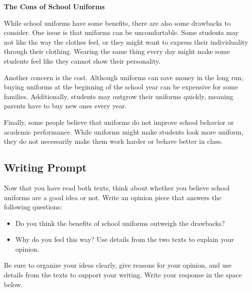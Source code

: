\documentclass[12pt]{article}
\begin{document}
\begin{tcolorbox}[colframe=black!40, colback=gray!5]

\textbf{The Cons of School Uniforms}

While school uniforms have some benefits, there are also some drawbacks to consider. One issue is that uniforms can be uncomfortable. Some students may not like the way the clothes feel, or they might want to express their individuality through their clothing. Wearing the same thing every day might make some students feel like they cannot show their personality.

Another concern is the cost. Although uniforms can save money in the long run, buying uniforms at the beginning of the school year can be expensive for some families. Additionally, students may outgrow their uniforms quickly, meaning parents have to buy new ones every year.

Finally, some people believe that uniforms do not improve school behavior or academic performance. While uniforms might make students look more uniform, they do not necessarily make them work harder or behave better in class.

\end{tcolorbox}

\vspace{0.5cm}

\subsection*{Writing Prompt}

\noindent Now that you have read both texts, think about whether you believe school uniforms are a good idea or not. Write an opinion piece that answers the following questions:

\begin{itemize}
    \item Do you think the benefits of school uniforms outweigh the drawbacks?
    \item Why do you feel this way? Use details from the two texts to explain your opinion.
\end{itemize}

\noindent Be sure to organize your ideas clearly, give reasons for your opinion, and use details from the texts to support your writing. Write your response in the space below.

\vspace{1cm}

\underline{\hspace{16cm}}

\vspace{1cm}

\underline{\hspace{16cm}}

\vspace{1cm}

\underline{\hspace{16cm}}
\end{document}
